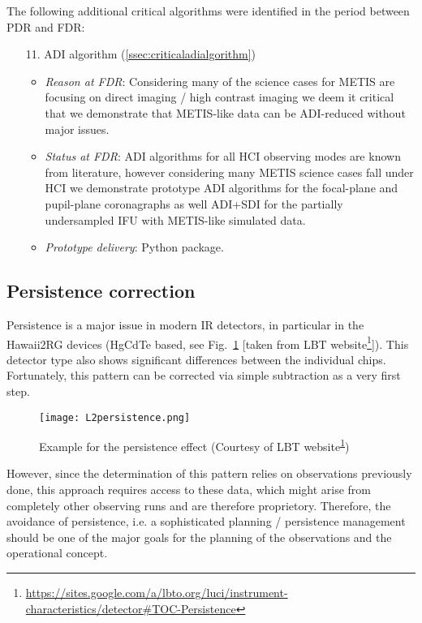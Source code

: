 The following additional critical algorithms were identified in the period between PDR and FDR:

\begin{enumerate}
    \item[11.] ADI algorithm (\ref{ssec:criticaladialgorithm})
    \begin{itemize}
        \item \textit{Reason at FDR}: Considering many of the science cases for METIS are focusing on direct imaging / high contrast imaging we deem it critical that we demonstrate that METIS-like data can be ADI-reduced without major issues.
        \item \textit{Status at FDR}: ADI algorithms for all HCI observing modes are known from literature, however considering many METIS science cases fall under HCI we demonstrate prototype ADI algorithms for the focal-plane and pupil-plane coronagraphs as well ADI+SDI for the partially undersampled \ac{IFU} with METIS-like simulated data.
        \item \textit{Prototype delivery}: Python package.
    \end{itemize}
\end{enumerate}

\subsection{Persistence correction}\label{ssec:criticalpersistencecorrection}
\label{sec_persistence_correction}
Persistence is a major issue in modern IR detectors, in particular in the Hawaii2RG devices (HgCdTe based, see Fig.~\ref{fig:h2rg_persistence} [taken from LBT website\footnote{\url{https://sites.google.com/a/lbto.org/luci/instrument-characteristics/detector\#TOC-Persistence}\label{fn:persistence}}]).
This detector type also shows significant differences between the individual chips.
Fortunately, this pattern can be corrected via simple subtraction as a very first step.

\begin{figure}[ht]
  \centering
  \texttt{[image: L2persistence.png]}
  \caption[Persistence example]{Example for the persistence effect (Courtesy
    of LBT website\textsuperscript{\ref{fn:persistence}})}
  \label{fig:h2rg_persistence}
\end{figure}

However, since the determination of this pattern relies on observations previously done, this approach requires access to these data, which might arise from completely other observing runs and are therefore proprietory.
Therefore, the avoidance of persistence, i.e. a sophisticated planning / persistence management should be one of the major goals for the planning of the observations and the operational concept.


